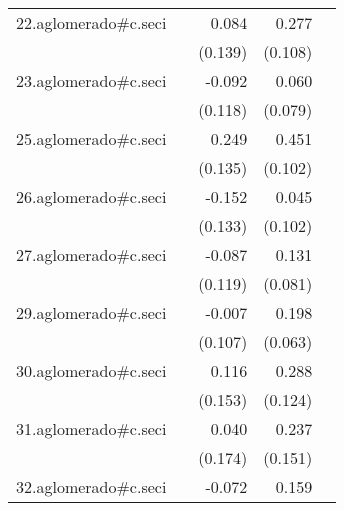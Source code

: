 {\begin{longtable}{l*{4}{D{.}{.}{-1}}}
\addlinespace
22.aglomerado#c.seci&                     &       0.084         &       0.277\sym{*}  &                     \\
            &                     &     (0.139)         &     (0.108)         &                     \\
\addlinespace
23.aglomerado#c.seci&                     &      -0.092         &       0.060         &                     \\
            &                     &     (0.118)         &     (0.079)         &                     \\
\addlinespace
25.aglomerado#c.seci&                     &       0.249         &       0.451\sym{***}&                     \\
            &                     &     (0.135)         &     (0.102)         &                     \\
\addlinespace
26.aglomerado#c.seci&                     &      -0.152         &       0.045         &                     \\
            &                     &     (0.133)         &     (0.102)         &                     \\
\addlinespace
27.aglomerado#c.seci&                     &      -0.087         &       0.131         &                     \\
            &                     &     (0.119)         &     (0.081)         &                     \\
\addlinespace
29.aglomerado#c.seci&                     &      -0.007         &       0.198\sym{**} &                     \\
            &                     &     (0.107)         &     (0.063)         &                     \\
\addlinespace
30.aglomerado#c.seci&                     &       0.116         &       0.288\sym{*}  &                     \\
            &                     &     (0.153)         &     (0.124)         &                     \\
\addlinespace
31.aglomerado#c.seci&                     &       0.040         &       0.237         &                     \\
            &                     &     (0.174)         &     (0.151)         &                     \\
\addlinespace
32.aglomerado#c.seci&                     &      -0.072         &       0.159         &                     \\

\end{longtable}}

